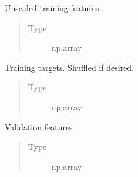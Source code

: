 \documentclass[letterpaper,10pt,english]{sphinxmanual}
\begin{document}
\begin{fulllineitems}
\begin{fulllineitems}
\begin{quote}
\begin{description}
\end{description}\end{quote}

\end{fulllineitems}


\begin{fulllineitems}
\label{\detokenize{api/ucf.TrainingDataSets:ucf.TrainingDataSets.train_features}}
Unscaled training features.
\begin{quote}\begin{description}
\item[{Type}] \leavevmode
np.array

\end{description}\end{quote}

\end{fulllineitems}


\begin{fulllineitems}
\label{\detokenize{api/ucf.TrainingDataSets:ucf.TrainingDataSets.train_targets}}
Training targets. Shuffled if desired.
\begin{quote}\begin{description}
\item[{Type}] \leavevmode
np.array

\end{description}\end{quote}

\end{fulllineitems}


\begin{fulllineitems}
\label{\detokenize{api/ucf.TrainingDataSets:ucf.TrainingDataSets.validation_features}}
Validation features
\begin{quote}\begin{description}
\item[{Type}] \leavevmode
np.array


\end{description}
\end{quote}
\end{fulllineitems}
\end{fulllineitems}
\end{document}
